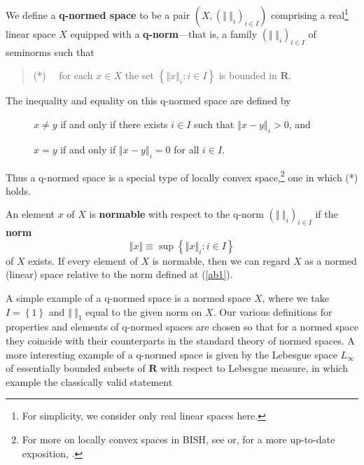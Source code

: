 \documentclass[11pt]{article}%
\begin{document}
We define a \textbf{q-normed space} to be a pair $\left(  X,\left(  \left\Vert
\ \right\Vert _{i}\right)  _{i\in I}\right)  $ comprising a real\footnote{%
\normalfont\sf
For simplicity, we consider only real linear spaces here.} linear space $X$
equipped with a \textbf{q-norm}---that is, a family $(\left\Vert \ \right\Vert
_{i})_{i\in I}$ of seminorms such that

\begin{quote}
(*) \ \ for each $x\in X$ the set $\left\{  \left\Vert x\right\Vert _{i}:i\in
I\right\}  $ is bounded in $\mathbf{R}$.
\end{quote}

%

\noindent
The inequality and equality on this q-normed space are defined by

\begin{description}
\item[ ] $x\neq y$ if and only if there exists $i\in I$ such that $\left\Vert
x-y\right\Vert _{i}>0$, and

\item[ ] $x=y$ if and only if $\left\Vert x-y\right\Vert _{i}=0$ for all $i\in
I$.
\end{description}

%

\noindent
Thus a q-normed space is a special type of locally convex space,\footnote{%
\normalfont\sf
For more on locally convex spaces in BISH, see \cite[Ch. 9, Sect. 5]{Bishop}
or, for a more up-to-date exposition, \cite{dsbconvex}.} one in which (*) holds.

An element $x$ of $X$ is \textbf{normable} with respect to the q-norm
$(\left\Vert \ \right\Vert _{i})_{i\in I}$ if the \textbf{norm}%
\begin{equation}
\left\Vert x\right\Vert \equiv\sup\left\{  \left\Vert x\right\Vert _{i}:i\in
I\right\}  \label{ab1}%
\end{equation}
of $X$ exists. If every element of $X$ is normable, then we can regard $X$ as
a normed (linear) space relative to the norm defined at (\ref{ab1}).

A simple example of a q-normed space is a normed space $X$, where we take
$I=\left\{  1\right\}  $ and $\left\Vert \ \right\Vert _{1}$ equal to the
given norm on $X$. Our various definitions for properties and elements of
q-normed spaces are chosen so that for a normed space they coincide with their
counterparts in the standard theory of normed spaces. A more interesting
example of a q-normed space is given by the Lebesgue space $L_{\infty}\ $of
essentially bounded subsets of $\mathbf{R}$ with respect to Lebesgue measure,
in which example the classically valid statement
\end{document}
